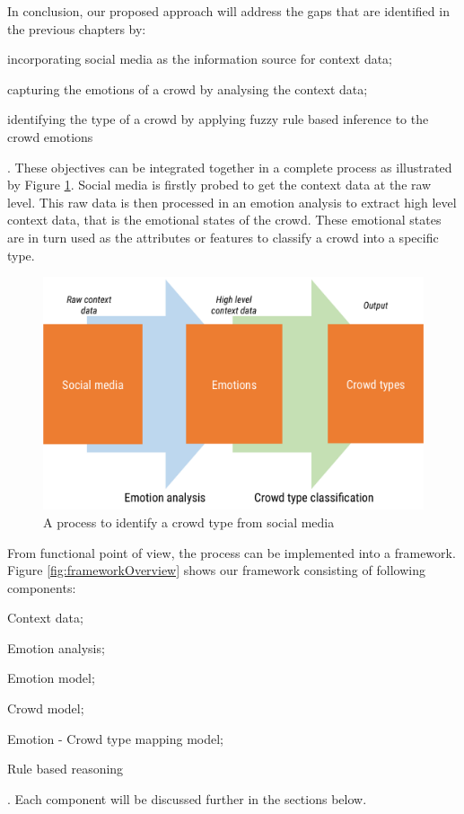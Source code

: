 In conclusion, our proposed approach will address the gaps that are identified in the previous chapters by: 
\begin{inparaenum}[i)]
\item incorporating social media as the information source for context data;
\item capturing the emotions of a crowd by analysing the context data;
\item identifying the type of a crowd by applying fuzzy rule based inference to the crowd emotions
\end{inparaenum}. These objectives can be integrated together in a complete process as illustrated by Figure \ref{fig:processOverview}. Social media is firstly probed to get the context data at the raw level. This raw data is then processed in an emotion analysis to extract high level context data, that is the emotional states of the crowd. These emotional states are in turn used as the attributes or features to classify a crowd into a specific type.

\begin{figure}[htb!] 
\centering    
\includegraphics[width=1.0\textwidth]{ProcessOverview}
\caption{A process to identify a crowd type from social media}
\label{fig:processOverview}
\end{figure}

From functional point of view, the process can be implemented into a framework. Figure \ref{fig:frameworkOverview} shows our framework consisting of following components:
\begin{inparaenum}[i)]
\item Context data;
\item Emotion analysis;
\item Emotion model;
\item Crowd model;
\item Emotion - Crowd type mapping model;
\item Rule based reasoning
\end{inparaenum}. Each component will be discussed further in the sections below.


